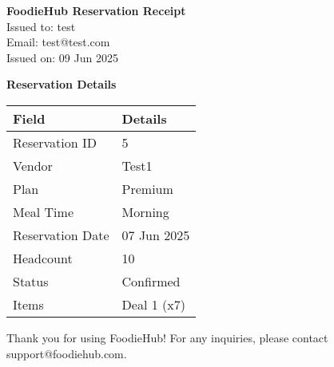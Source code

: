 \documentclass[a4paper,12pt]{article}
\begin{document}
\begin{center}
  \LARGE\textbf{FoodieHub Reservation Receipt}\\
  \vspace{0.5cm}
  \large Issued to: test \\
  Email: test@test.com \\
  Issued on: 09 Jun 2025
\end{center}

\vspace{1cm}

\noindent\textbf{Reservation Details}\\
\begin{tabular}{ll}
  \toprule
  \textbf{Field} & \textbf{Details} \\
  \midrule
  Reservation ID & 5 \\
  Vendor & Test1 \\
  Plan & Premium \\
  Meal Time & Morning \\
  Reservation Date & 07 Jun 2025 \\
  Headcount & 10 \\
  Status & Confirmed \\
  Items & Deal 1 (x7) \\
  \bottomrule
\end{tabular}

\vspace{1cm}

\noindent Thank you for using FoodieHub! For any inquiries, please contact support@foodiehub.com.
\end{document}
